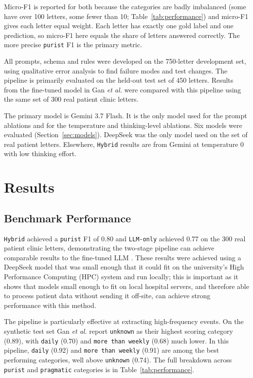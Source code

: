 \documentclass[conference]{IEEEtran}
\begin{document}
Micro-F1 is reported for both because the 
categories are badly imbalanced (some have over 100 letters, 
some fewer than 10; Table~\ref{tab:performance}) and micro-F1 
gives each letter equal weight. Each letter has exactly one 
gold label and one prediction, so micro-F1 here equals the 
share of letters answered correctly. The more precise 
\texttt{purist} F1 is the primary metric.

All prompts, schema and rules were developed on the 
750-letter development set, using qualitative error analysis to 
find failure modes and test changes. The pipeline is primarily
evaluated on the held-out test set of 450 letters. Results
from the fine-tuned model in Gan \emph{et al.} \cite{b3} were compared
with this pipeline using the same set of 300 real patient clinic letters.

The primary model is Gemini 3.7 Flash. It is the only model 
used for the prompt ablations and for the temperature and thinking-level 
ablations. Six models were evaluated (Section~\ref{sec:models}). DeepSeek
was the only model used on the set of real patient letters. Elsewhere, 
\texttt{Hybrid} results are from Gemini at temperature 0 with 
low thinking effort. 

\section{Results}

\subsection{Benchmark Performance}
\label{sec:benchmark}

\texttt{Hybrid} achieved a \texttt{purist} F1 of 0.80 and
\texttt{LLM-only} achieved 0.77 on the 300 real patient 
clinic letters, demonstrating the two-stage pipeline can
achieve comparable results to the fine-tuned LLM \cite{b3}.
These results were achieved using a DeepSeek model 
that was small enough that it could fit on the university's
High Performance Computing (HPC) system and run locally; 
this is important as it shows that models small enough to
fit on local hospital servers, and therefore able to process patient 
data without sending it off-site, can achieve strong performance with this method.

The pipeline is particularly effective at extracting 
high-frequency events. On the synthetic test set 
Gan \emph{et al.} report \texttt{unknown} 
as their highest scoring category (0.89), with \texttt{daily} (0.70) 
and \texttt{more than weekly} (0.68) much lower. In this pipeline,
\texttt{daily} (0.92) and \texttt{more than weekly} (0.91) are among the 
best performing categories, well above \texttt{unknown} (0.74). 
The full breakdown across \texttt{purist} and \texttt{pragmatic} 
categories is in Table~\ref{tab:performance}.
\end{document}
